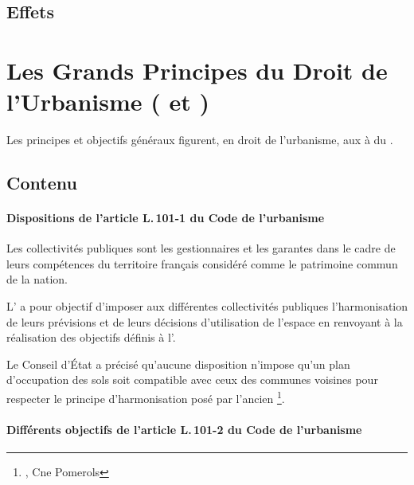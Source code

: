 	\subsection{Effets}

\section[Les GPDU]{Les Grands Principes du Droit de l'Urbanisme ( et )}

	Les principes et objectifs généraux figurent, en droit de l'urbanisme, aux  à  du \cu.

	\subsection{Contenu}

		\paragraph{Dispositions de l'article L.\,101-1 du Code de l'urbanisme}

			Les collectivités publiques sont les gestionnaires et les garantes dans le cadre de leurs compétences du territoire français considéré comme le patrimoine commun de la nation.

			L' a pour objectif d'imposer aux différentes collectivités publiques l'harmonisation de leurs prévisions et de leurs décisions d'utilisation de l'espace en renvoyant à la réalisation des objectifs définis à l'.

			Le Conseil d'État a précisé qu'aucune disposition n'impose qu'un plan d'occupation des sols soit compatible avec ceux des communes voisines pour respecter le principe d'harmonisation posé par l'ancien \footnote{, Cne Pomerols}.

		\paragraph{Différents objectifs de l’article L.\,101-2 du Code de l'urbanisme}

